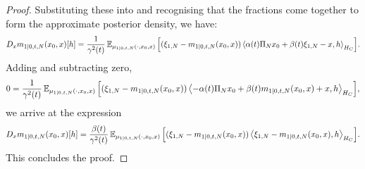 \begin{lemma}
\begin{proof}
    Substituting these into  and recognising that the fractions come together to form the approximate posterior density, we have:
    \[
      D_{x} m_{1 \mid 0, t, N}(x_{0}, x)[h] = \frac{1}{\gamma^{2}(t)}\mathop{\mathbb{E}_{\mu_{1 \mid 0, t, N}(\cdot, x_{0}, x)}}\qty[(\xi_{1, N} - m_{1 \mid 0, t, N}(x_{0}, x))\ev{\alpha(t) \Pi_{N} x_{0} + \beta(t) \xi_{1, N} - x, h}_{H_{C}}].
    \]
    Adding and subtracting zero,
    \[
      0 = \frac{1}{\gamma^{2}(t)} \mathop{\mathbb{E}_{\mu_{1 \mid 0, t ,N}(\cdot, x_{0}, x)}}\qty[(\xi_{1, N} - m_{1 \mid 0, t, N}(x_{0}, x)) \ev{- \alpha(t) \Pi_{N} x_{0}  + \beta(t) m_{1 \mid 0, t, N}(x_{0}, x) + x, h}_{H_{C}}],
    \]
    we arrive at the expression
    \[
      D_{x} m_{1 \mid 0, t, N}(x_{0}, x)[h] = \frac{\beta(t)}{\gamma^{2}(t)}\mathop{\mathbb{E}_{\mu_{1 \mid 0, t, N}(\cdot, x_{0}, x)}}\qty[(\xi_{1, N} - m_{1 \mid 0, t, N}(x_{0}, x))\ev{\xi_{1, N} - m_{1 \mid 0, t, N}(x_{0}, x), h}_{H_{C}}].
    \]
    This concludes the proof.
  \end{proof}
\end{lemma}

